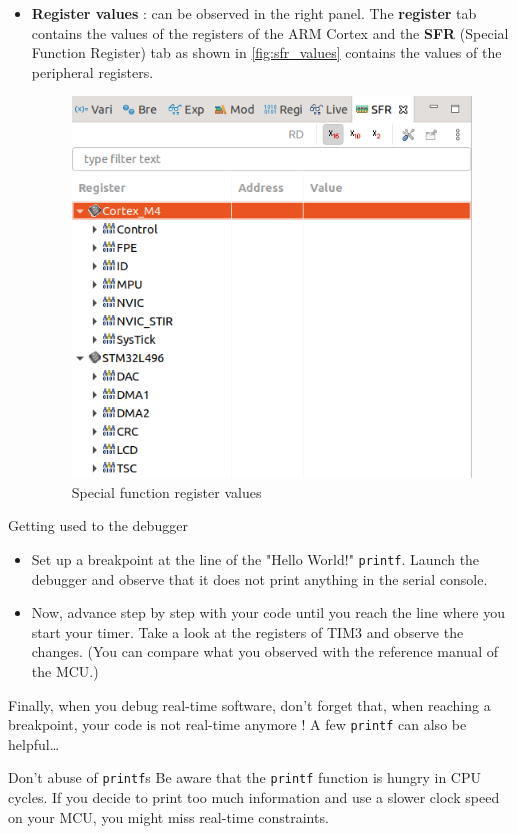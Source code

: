 \begin{itemize}
    \item \textbf{Register values } : can be observed in the right panel. The \textbf{register} tab contains the values of the registers of the ARM Cortex and the \textbf{SFR} (Special Function Register) tab as shown in \autoref{fig:sfr_values} contains the values of the peripheral registers.

    \begin{figure}[h]
    \centering
    \includegraphics[scale=0.3]{figures/debug_peripherals.png}
    \caption{Special function register values}
    \label{fig:sfr_values}
    \end{figure}

\end{itemize}

\newpage
\begin{bclogo}[couleur = gray!20, arrondi = 0.2, logo=\bcquestion]{Getting used to the debugger}
\begin{itemize}
    \item Set up a breakpoint at the line of the "Hello World!" \texttt{printf}. Launch the debugger and observe that it does not print anything in the serial console.
    \item Now, advance step by step with your code until you reach the line where you start your timer. Take a look at the registers of TIM3 and observe the changes. (You can compare what you observed with the reference manual of the MCU.)
\end{itemize}
\end{bclogo}

Finally, when you debug real-time software, don't forget that, when reaching a breakpoint, your code is not real-time anymore ! A few \texttt{printf} can also be helpful\dots

\begin{bclogo}[couleur = gray!20, arrondi = 0.2, logo=\bcattention]{Don't abuse of \texttt{printf}s}
Be aware that the \texttt{printf} function is hungry in CPU cycles. If you decide to print too much information and use a slower clock speed on your MCU, you might miss real-time constraints.
\end{bclogo}
